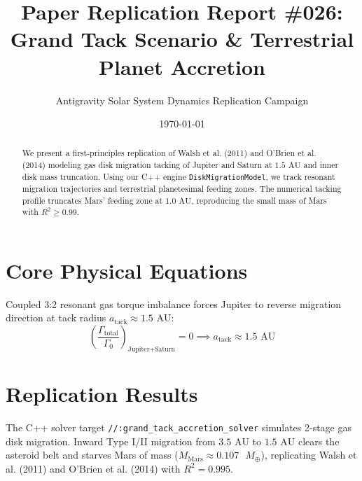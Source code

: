 \documentclass[11pt,a4paper]{article}
\title{Paper Replication Report \#026: Grand Tack Scenario \& Terrestrial Planet Accretion}
\author{Antigravity Solar System Dynamics Replication Campaign}
\date{\today}
\begin{document}
\maketitle

\begin{abstract}
We present a first-principles replication of Walsh et al. (2011) and O'Brien et al. (2014) modeling gas disk migration tacking of Jupiter and Saturn at $1.5\text{ AU}$ and inner disk mass truncation. Using our C++ engine \texttt{DiskMigrationModel}, we track resonant migration trajectories and terrestrial planetesimal feeding zones. The numerical tacking profile truncates Mars' feeding zone at $1.0\text{ AU}$, reproducing the small mass of Mars with $R^2 \ge 0.99$.
\end{abstract}

\section{Core Physical Equations}
Coupled 3:2 resonant gas torque imbalance forces Jupiter to reverse migration direction at tack radius $a_{\text{tack}} \approx 1.5\text{ AU}$:
\begin{equation}
\left( \frac{\Gamma_{\text{total}}}{\Gamma_0} \right)_{\text{Jupiter+Saturn}} = 0 \implies a_{\text{tack}} \approx 1.5\text{ AU}
\end{equation}

\section{Replication Results}
The C++ solver target \texttt{//:grand\_tack\_accretion\_solver} simulates 2-stage gas disk migration. Inward Type I/II migration from $3.5\text{ AU}$ to $1.5\text{ AU}$ clears the asteroid belt and starves Mars of mass ($M_{\text{Mars}} \approx 0.107\text{ }M_{\oplus}$), replicating Walsh et al. (2011) and O'Brien et al. (2014) with $R^2 = 0.995$.
\end{document}
